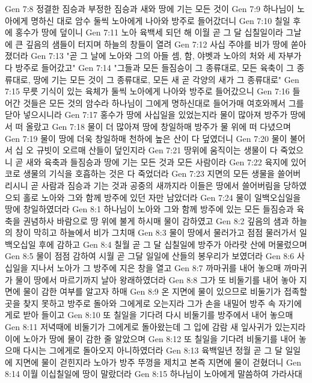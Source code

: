 Gen 7:8  정결한 짐승과 부정한 짐승과 새와 땅에 기는 모든 것이
Gen 7:9  하나님이 노아에게 명하신 대로 암수 둘씩 노아에게 나아와 방주로 들어갔더니
Gen 7:10  칠일 후에 홍수가 땅에 덮이니
Gen 7:11  노아 육백세 되던 해 이월 곧 그 달 십칠일이라 그날에 큰 깊음의 샘들이 터지며 하늘의 창들이 열려
Gen 7:12  사십 주야를 비가 땅에 쏟아졌더라
Gen 7:13  "곧 그 날에 노아와 그의 아들 셈, 함, 야벳과 노아의 처와 세 자부가 다 방주로 들어갔고"
Gen 7:14  "그들과 모든 들짐승이 그 종류대로, 모든 육축이 그 종류대로, 땅에 기는 모든 것이 그 종류대로, 모든 새 곧 각양의 새가 그 종류대로"
Gen 7:15  무릇 기식이 있는 육체가 둘씩 노아에게 나아와 방주로 들어갔으니
Gen 7:16  들어간 것들은 모든 것의 암수라 하나님이 그에게 명하신대로 들어가매 여호와께서 그를 닫아 넣으시니라
Gen 7:17  홍수가 땅에 사십일을 있었는지라 물이 많아져 방주가 땅에서 떠 올랐고
Gen 7:18  물이 더 많아져 땅에 창일하매 방주가 물 위에 떠 다녔으며
Gen 7:19  물이 땅에 더욱 창일하매 천하에 높은 산이 다 덮였더니
Gen 7:20  물이 불어서 십 오 규빗이 오르매 산들이 덮인지라
Gen 7:21  땅위에 움직이는 생물이 다 죽었으니 곧 새와 육축과 들짐승과 땅에 기는 모든 것과 모든 사람이라
Gen 7:22  육지에 있어 코로 생물의 기식을 호흡하는 것은 다 죽었더라
Gen 7:23  지면의 모든 생물을 쓸어버리시니 곧 사람과 짐승과 기는 것과 공중의 새까지라 이들은 땅에서 쓸어버림을 당하였으되 홀로 노아와 그와 함께 방주에 있던 자만 남았더라
Gen 7:24  물이 일백오십일을 땅에 창일하였더라
Gen 8:1  하나님이 노아와 그와 함께 방주에 있는 모든 들짐승과 육축을 권념하사 바람으로 땅 위에 불게 하시매 물이 감하였고
Gen 8:2  깊음의 샘과 하늘의 창이 막히고 하늘에서 비가 그치매
Gen 8:3  물이 땅에서 물러가고 점점 물러가서 일백오십일 후에 감하고
Gen 8:4  칠월 곧 그 달 십칠일에 방주가 아라랏 산에 머물렀으며
Gen 8:5  물이 점점 감하여 시월 곧 그달 일일에 산들의 봉우리가 보였더라
Gen 8:6  사십일을 지나서 노아가 그 방주에 지은 창을 열고
Gen 8:7  까마귀를 내어 놓으매 까마귀가 물이 땅에서 마르기까지 날아 왕래하였더라
Gen 8:8  그가 또 비둘기를 내어 놓아 지면에 물이 감한 여부를 알고자 하매
Gen 8:9  온 지면에 물이 있으므로 비둘기가 접족할 곳을 찾지 못하고 방주로 돌아와 그에게로 오는지라 그가 손을 내밀어 방주 속 자기에게로 받아 들이고
Gen 8:10  또 칠일을 기다려 다시 비둘기를 방주에서 내어 놓으매
Gen 8:11  저녁때에 비둘기가 그에게로 돌아왔는데 그 입에 감람 새 잎사귀가 있는지라 이에 노아가 땅에 물이 감한 줄 알았으며
Gen 8:12  또 칠일을 기다려 비둘기를 내어 놓으매 다시는 그에게로 돌아오지 아니하였더라
Gen 8:13  육백일년 정월 곧 그 달 일일에 지면에 물이 걷힌지라 노아가 방주 뚜껑을 제치고 본즉 지면에 물이 걷혔더니
Gen 8:14  이월 이십칠일에 땅이 말랐더라
Gen 8:15  하나님이 노아에게 말씀하여 가라사대
